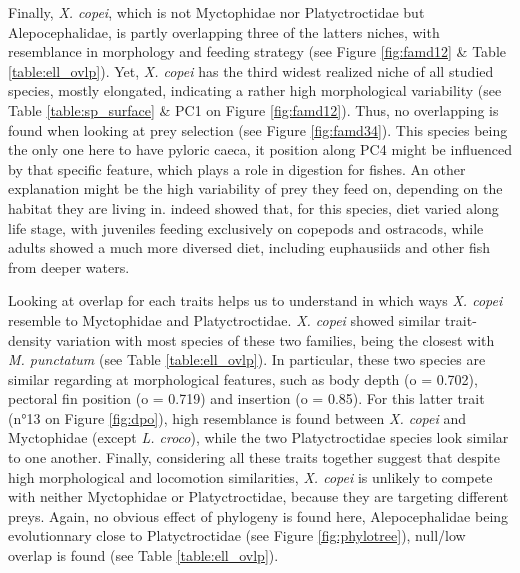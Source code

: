Finally, \textit{X. copei}, which is not Myctophidae nor Platyctroctidae but Alepocephalidae, is partly overlapping three of the latters niches, with resemblance in morphology and feeding strategy (see Figure \ref{fig:famd12} \& Table \ref{table:ell_ovlp}). Yet, \textit{X. copei} has the third widest realized niche of all studied species, mostly elongated, indicating a rather high morphological variability (see Table \ref{table:sp_surface} \& PC1 on Figure \ref{fig:famd12}). Thus, no overlapping is found when looking at prey selection (see Figure \ref{fig:famd34}). This species being the only one here to have pyloric caeca, it position along PC4 might be influenced by that specific feature, which plays a role in digestion for fishes. An other explanation might be the high variability of prey they feed on, depending on the habitat they are living in. \citet{mauchline1983} indeed showed that, for this species, diet varied along life stage, with juveniles feeding exclusively on copepods and ostracods, while adults showed a much more diversed diet, including euphausiids and other fish from deeper waters. 

Looking at overlap for each traits helps us to understand in which ways \textit{X. copei} resemble to Myctophidae and Platyctroctidae. \textit{X. copei} showed similar trait-density variation with most species of these two families, being the closest with \textit{M. punctatum} (see Table \ref{table:ell_ovlp}). In particular, these two species are similar regarding at morphological features, such as body depth (o = 0.702), pectoral fin position (o = 0.719) and insertion (o = 0.85). For this latter trait (n°13 on Figure \ref{fig:dpo}), high resemblance is found between \textit{X. copei} and Myctophidae (except \textit{L. croco}), while the two Platyctroctidae species look similar to one another. Finally, considering all these traits together suggest that despite high morphological and locomotion similarities, \textit{X. copei} is unlikely to compete with neither Myctophidae or Platyctroctidae, because they are targeting different preys. Again, no obvious effect of phylogeny is found here, Alepocephalidae being evolutionnary close to Platyctroctidae (see Figure \ref{fig:phylotree}), null/low overlap is found (see Table \ref{table:ell_ovlp}). \\







